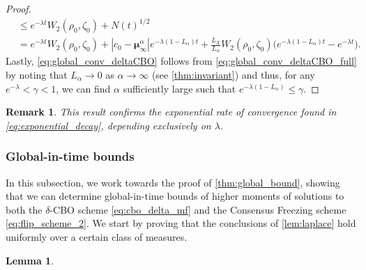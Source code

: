 \documentclass[reqno]{amsart}
\numberwithin{algorithm}{section}
\newtheorem{lemma}[theorem]{Lemma}
\newtheorem{remark}[theorem]{Remark}
\begin{document}
{\begin{proof}
\begin{align*}
        &\leq e^{-\lambda t} W_2(\rho_0, \zeta_0) + N(t)^{1/2} \\
        &= e^{-\lambda t} W_2(\rho_0, \zeta_0) + |c_0 - \boldsymbol\mu_\infty^\alpha| e^{-\lambda (1 - L_\alpha) t} + \frac{L_X}{L_\alpha} W_2(\rho_0, \zeta_0) \big(e^{-\lambda (1 - L_\alpha)t} - e^{-\lambda t}\big).
    \end{align*}
    Lastly, \cref{eq:global_conv_deltaCBO} follows from \cref{eq:global_conv_deltaCBO_full} by noting that $L_\alpha \to 0$ as $\alpha \to \infty$ (see \cref{thm:invariant}) and thus, for any $e^{-\lambda} < \gamma < 1$, we can find $\alpha$ sufficiently large such that $e^{-\lambda (1 - L_\alpha)} \leq \gamma$.
\end{proof}

\begin{remark}
    This result confirms the exponential rate of convergence found in \eqref{eq:exponential_decay}, depending exclusively on $\lambda$.
\end{remark}

\subsubsection{Global-in-time bounds}\label{sec:global-in-time-bounds}
    In this subsection, we work towards the proof of \cref{thm:global_bound}, showing that we can determine global-in-time bounds of {higher moments} of solutions to both the $\delta$-CBO scheme \eqref{eq:cbo_delta_mf} and the Consensus Freezing scheme \eqref{eq:flip_scheme_2}.
    We start by proving that the conclusions of \cref{lem:laplace} hold uniformly over a certain class of measures.
    \begin{lemma}\label{lem:global_xalpha_bound}
       

\end{lemma}}
\end{document}
